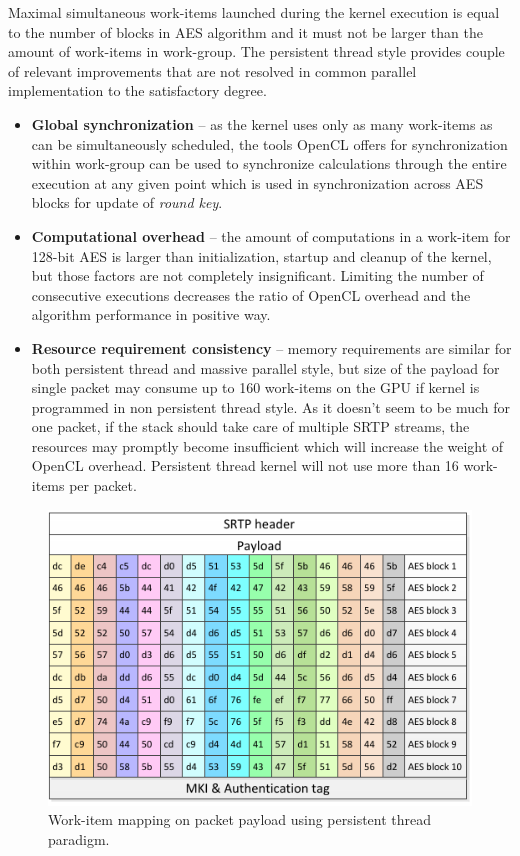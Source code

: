 Maximal simultaneous work-items launched during the kernel execution is equal
to the number of blocks in AES algorithm and it must not be larger than the
amount of work-items in work-group. The persistent thread style provides 
couple of relevant improvements that are not resolved in common parallel 
implementation to the satisfactory degree.

\begin{itemize}
\item \textbf{Global synchronization} -- as the kernel uses only as many 
work-items as can be simultaneously scheduled, the tools OpenCL offers
for synchronization within work-group can be used to synchronize calculations
through the entire execution at any given point which is used in 
synchronization across AES blocks for update of \textit{round key}.
\item \textbf{Computational overhead} -- the amount of computations in a 
work-item for 128-bit AES is larger than initialization, startup and cleanup
of the kernel, but those factors are not completely insignificant. Limiting
the number of consecutive executions decreases the ratio of OpenCL overhead and
the algorithm performance in positive way.
\item \textbf{Resource requirement consistency} -- memory requirements are
similar for both persistent thread and massive parallel style, but size of the 
payload for single packet may consume up to 160 work-items on the GPU if kernel
is programmed in non persistent thread style. As it doesn't seem to be much for
one packet, if the stack should take care of multiple SRTP streams, the 
resources may promptly become insufficient which will increase the weight of 
OpenCL overhead. Persistent thread kernel will not use more than 16 work-items
per packet.
\end{itemize}

\begin{figure}[H]
\centering
\includegraphics[width=12cm]{fig/packet_wi.pdf}
\caption{Work-item mapping on packet payload using persistent thread paradigm.}
\label{pt_payload}
\end{figure}


